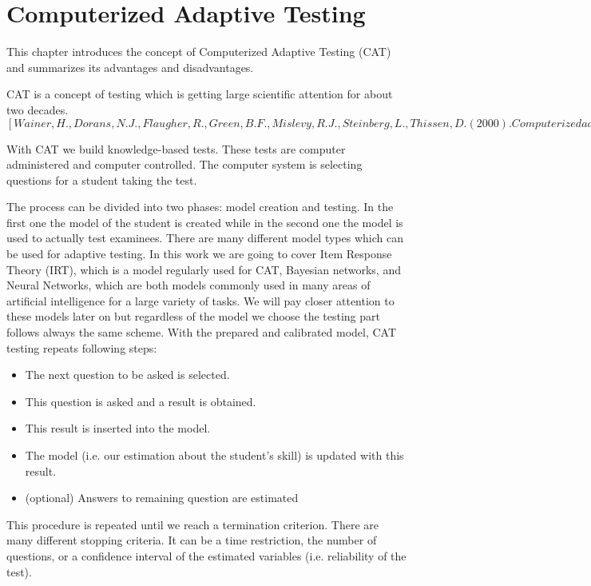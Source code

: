 \chapter{Computerized Adaptive Testing}
This chapter introduces the concept of Computerized Adaptive Testing (CAT) and summarizes its advantages and disadvantages.

CAT is a concept of testing which is getting large scientific attention for about two decades. 
$[Wainer, H., Dorans, N. J., Flaugher, R., Green, B. F., Mislevy, R. J., Steinberg, L., Thissen, D. (2000). Computerized adaptive testing: A primer (2nd ed.). Mahwah: Lawrence Erlbaum.
van der Linden, W. J., Glas, C. A. W. (2010). Elements of adaptive testing. New York: Springer.
van der Linden, Wim J., Glas, Cees A. W. (Eds.), Computerized Adaptive Testing: Theory and Practice].$

With CAT we build knowledge-based tests. These tests are computer administered and computer controlled. The computer system is selecting questions for a student taking the test. 


The process can be divided into two phases: model creation and testing. In the first one the model of the student is created while in the second one the model is used to actually test examinees. There are many different model types which can be used for adaptive testing. In this work we are going to cover Item Response Theory (IRT), which is a model regularly used for CAT, Bayesian networks, and Neural Networks, which are both models commonly used in many areas of artificial intelligence for a large variety of tasks. We will pay closer attention to these models later on but regardless of the model we choose the testing part follows always the same scheme. With the prepared and calibrated model, CAT testing repeats following steps:

\label{sec:CATprocess}
\begin{itemize}
	\item The next question to be asked is selected.
	\item This question is asked and a result is obtained.
	\item This result is inserted into the model.
	\item The model (i.e. our estimation about the student's skill) is updated with this result.
	\item (optional) Answers to remaining question are estimated
\end{itemize}

This procedure is repeated until we reach a termination criterion. There are many different stopping criteria. It can be a time restriction, the number of questions, or a confidence interval of the estimated variables (i.e. reliability of the test).

